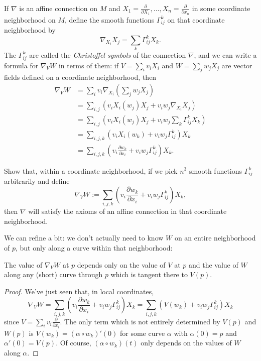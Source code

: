 If $\nabla$ is an affine connection on $M$ and $X_1 = \frac{\partial}{\partial X_1}, \dots , X_n = \frac{\partial}{\partial x_n}$ in some coordinate neighborhood on $M$, define the smooth functions $\Gamma_{ij}^k$ on that coordinate neighborhood by
\[
	\nabla_{X_i} X_j = \sum_{k} \Gamma_{ij}^k X_k.
\]
The $\Gamma_{ij}^k$ are called the \emph{Christoffel symbols} of the connection $\nabla$, and we can write a formula for $\nabla_V W$ in terms of them: if $V = \sum_i v_i X_i$ and $W = \sum_j w_j X_j$ are vector fields defined on a coordinate neighborhood, then
\begin{align*}
	\nabla_V W & = \sum_i v_i \nabla_{X_i} \left( \sum_j w_j X_j \right) \\
	& = \sum_{i,j}\left( v_i X_i(w_j) X_j + v_i w_j \nabla_{X_i} X_j \right) \\
	& = \sum_{i,j}\left( v_i X_i(w_j) X_j + v_i w_j \sum_k \Gamma_{ij}^k X_k \right) \\
	& = \sum_{i,j,k} \left( v_i X_i(w_k) + v_i w_j \Gamma_{ij}^k \right)X_k \\
	& = \sum_{i,j,k} \left( v_i \frac{\partial w_k}{\partial x_i} + v_i w_j \Gamma_{ij}^k \right)X_k .
\end{align*}

\begin{exercise}
	Show that, within a coordinate neighborhood, if we pick $n^3$ smooth functions $\Gamma_{ij}^k$ arbitrarily and define
	\[
		\nabla_V W := \sum_{i,j,k} \left( v_i \frac{\partial w_k}{\partial x_i} + v_i w_j \Gamma_{ij}^k \right)X_k,
	\]
	then $\nabla$ will satisfy the axioms of an affine connection in that coordinate neighborhood.
\end{exercise}

We can refine  a bit: we don't actually need to know $W$ on an entire neighborhood of $p$, but only along a curve within that neighborhood:

\begin{lemma}\label{lem:connection is local2}
	The value of $\nabla_V W$ at $p$ depends only on the value of $V$ at $p$ and the value of $W$ along any (short) curve through $p$ which is tangent there to $V(p)$.
\end{lemma}

\begin{proof}
	We've just seen that, in local coordinates,
	\begin{equation}\label{eq:connection local coords}
		\nabla_V W = \sum_{i,j,k} \left( v_i \frac{\partial w_k}{\partial x_i} + v_i w_j \Gamma_{ij}^k \right)X_k = \sum_{i,j,k} \left( V(w_k) + v_i w_j \Gamma_{ij}^k \right)X_k
	\end{equation}
	since $V = \sum_i v_i \frac{\partial }{\partial x_i}$. The only term which is not entirely determined by $V(p)$ and $W(p)$ is $V(w_k) = (\alpha \circ w_k)'(0)$ for some curve $\alpha$ with $\alpha(0) = p$ and $\alpha'(0) = V(p)$. Of course, $(\alpha \circ w_k)(t)$ only depends on the values of $W$ along $\alpha$.
\end{proof}

